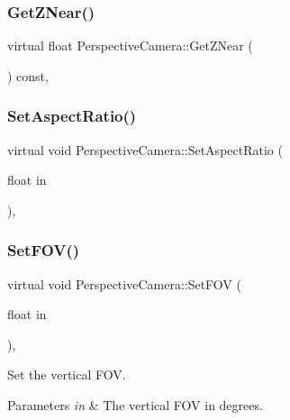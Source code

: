 \subsubsection{\texorpdfstring{Get\+Z\+Near()}{GetZNear()}}
{\footnotesize\ttfamily virtual float Perspective\+Camera\+::\+Get\+Z\+Near (\begin{DoxyParamCaption}{ }\end{DoxyParamCaption}) const\hspace{0.3cm}{\ttfamily [inline]}, {\ttfamily [virtual]}}

\hypertarget{class_perspective_camera_a2f8753cd16d119ed00d050b4dbac2510}{}\label{class_perspective_camera_a2f8753cd16d119ed00d050b4dbac2510}
\subsubsection{\texorpdfstring{Set\+Aspect\+Ratio()}{SetAspectRatio()}}
{\footnotesize\ttfamily virtual void Perspective\+Camera\+::\+Set\+Aspect\+Ratio (\begin{DoxyParamCaption}\item[{float}]{in }\end{DoxyParamCaption})\hspace{0.3cm}{\ttfamily [inline]}, {\ttfamily [virtual]}}

\hypertarget{class_perspective_camera_a03f2ce1c0940599712b12a07719b5122}{}\label{class_perspective_camera_a03f2ce1c0940599712b12a07719b5122}
\subsubsection{\texorpdfstring{Set\+F\+O\+V()}{SetFOV()}}
{\footnotesize\ttfamily virtual void Perspective\+Camera\+::\+Set\+F\+OV (\begin{DoxyParamCaption}\item[{float}]{in }\end{DoxyParamCaption})\hspace{0.3cm}{\ttfamily [inline]}, {\ttfamily [virtual]}}



Set the vertical F\+OV.


\begin{DoxyParams}{Parameters}
{\em in} & The vertical F\+OV in degrees. \\
\hline
\end{DoxyParams}
\hypertarget{class_perspective_camera_a4374ca73880370dad1b93eaf489c9bb4}{}\label{class_perspective_camera_a4374ca73880370dad1b93eaf489c9bb4}
